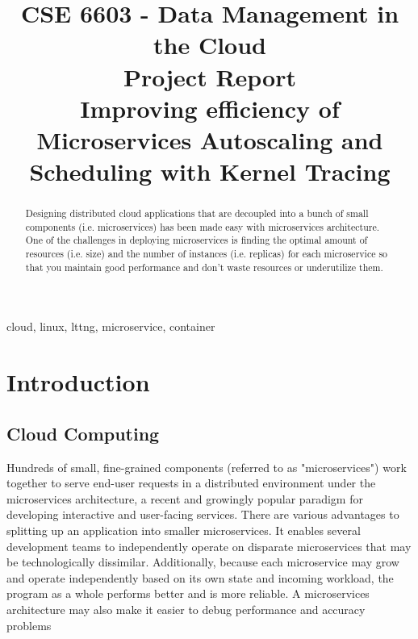 \documentclass[conference]{IEEEtran}
\begin{document}
\title{CSE 6603 - Data Management in the Cloud \\ Project Report \\ Improving efficiency of Microservices Autoscaling and Scheduling with Kernel Tracing}

\author{
\and
\and
}

\maketitle

\begin{abstract}
Designing distributed cloud applications that are decoupled into a bunch of small components (i.e. microservices) has been made easy with microservices architecture. One of the challenges in deploying microservices is finding the optimal amount of resources (i.e. size) and the number of instances (i.e. replicas) for each microservice so that you maintain good performance and don't waste resources or underutilize them. 
\end{abstract}

\begin{IEEEkeywords}
    cloud, linux, lttng, microservice, container
\end{IEEEkeywords}

\section{Introduction}
\subsection{Cloud Computing}
Hundreds of small, fine-grained components (referred to as "microservices") work together to serve end-user requests in a distributed environment under the microservices architecture, a recent and growingly popular paradigm for developing interactive and user-facing services\cite{netflix, azure, google, appEngine, burns}. There are various advantages to splitting up an application into smaller microservices. It enables several development teams to independently operate on disparate microservices that may be technologically dissimilar\cite{wolff}. Additionally, because each microservice may grow and operate independently based on its own state and incoming workload, the program as a whole performs better and is more reliable\cite{hao}. A microservices architecture may also make it easier to debug performance and accuracy problems \cite{b54}
\end{document}
